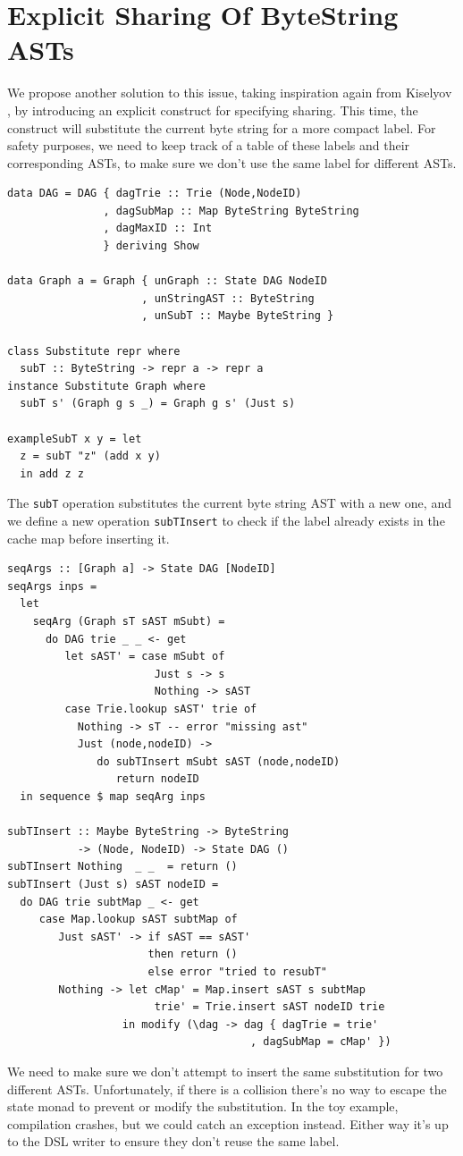 \documentclass[runningheads]{llncs}
\begin{document}
\section{Explicit Sharing Of ByteString ASTs}
We propose another solution to this issue, taking inspiration again from Kiselyov  
\cite{kiselyov:sharing}, by introducing an explicit construct for specifying
sharing. This time, the construct will substitute the current byte string for a
more compact label. For safety purposes, we need to keep track of a table of
these labels and their corresponding ASTs, to make sure we don't use the same label for different ASTs.
\begin{verbatim}
data DAG = DAG { dagTrie :: Trie (Node,NodeID)
               , dagSubMap :: Map ByteString ByteString
               , dagMaxID :: Int
               } deriving Show

data Graph a = Graph { unGraph :: State DAG NodeID
                     , unStringAST :: ByteString
                     , unSubT :: Maybe ByteString }

class Substitute repr where
  subT :: ByteString -> repr a -> repr a
instance Substitute Graph where
  subT s' (Graph g s _) = Graph g s' (Just s)

exampleSubT x y = let
  z = subT "z" (add x y)
  in add z z
\end{verbatim}

The \texttt{subT} operation substitutes the current byte string AST with a new one, and
we define a new operation \texttt{subTInsert} to check if
the label already exists in the cache map before inserting it.
\begin{verbatim}
seqArgs :: [Graph a] -> State DAG [NodeID]
seqArgs inps =
  let
    seqArg (Graph sT sAST mSubt) =
      do DAG trie _ _ <- get
         let sAST' = case mSubt of
                       Just s -> s
                       Nothing -> sAST
         case Trie.lookup sAST' trie of
           Nothing -> sT -- error "missing ast"
           Just (node,nodeID) ->
              do subTInsert mSubt sAST (node,nodeID)
                 return nodeID
  in sequence $ map seqArg inps

subTInsert :: Maybe ByteString -> ByteString
           -> (Node, NodeID) -> State DAG ()
subTInsert Nothing  _ _  = return ()
subTInsert (Just s) sAST nodeID =
  do DAG trie subtMap _ <- get
     case Map.lookup sAST subtMap of
        Just sAST' -> if sAST == sAST'
                      then return ()
                      else error "tried to resubT"
        Nothing -> let cMap' = Map.insert sAST s subtMap
                       trie' = Trie.insert sAST nodeID trie
                  in modify (\dag -> dag { dagTrie = trie'
                                      , dagSubMap = cMap' })
\end{verbatim}
We need to make sure we don't attempt to insert the same substitution for two
different ASTs. Unfortunately, if there is a collision there's no way to escape
the state monad to prevent or modify the substitution.
In the toy example, compilation crashes, but we could catch an exception instead.
Either way it's up to the DSL
writer to ensure they don't reuse the same label.
\end{document}
